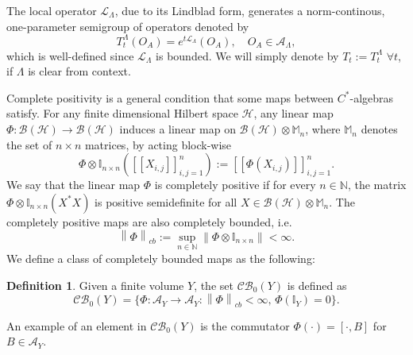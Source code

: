 \documentclass[11pt]{article}
\numberwithin{equation}{section}
\numberwithin{figure}{section}
\numberwithin{table}{section}
\theoremstyle{definition}
\newtheorem{mydef}{Definition}[section]
\theoremstyle{plain}
\theoremstyle{remark}
\newcommand{\Hil}{\mathcal{H}}
\newcommand{\Id}{\mathbb{I}}
\newcommand{\Li}{\mathcal{L}}
\newcommand{\A}{\mathcal{A}}
\newcommand{\La}{\Lambda}
\newcommand{\T}{T^\Lambda}
\newcommand{\norm}[1]{\left\lVert#1\right\rVert}
\newcommand{\normm}[2]{\left\lVert#1\right\rVert_{#2}}
\begin{document}
The local operator $\Li_\La$, due to its Lindblad form, generates a norm-continous, one-parameter semigroup of operators denoted by
\begin{equation}
    \T_t (O_A)=e^{t\Li_\La}(O_A),\quad O_A\in\A_\La,
\end{equation}
which is well-defined since $\Li_\La$ is bounded. We will simply denote by $T_t:=\T_t$ $\forall t$, if $\La$ is clear from context.

Complete positivity is a general condition that some maps between $C^*$-algebras satisfy. For any finite dimensional Hilbert space $\Hil$, any linear map $\Phi :\mathcal{B}(\Hil)\to\mathcal{B}(\Hil)$ induces a linear map on $\mathcal{B}(\Hil)\otimes \mathbb{M}_n$, where $\mathbb{M}_n$ denotes the set of $n\times n$ matrices, by acting block-wise
\begin{equation}
    \Phi\otimes \Id_{n\times n}([[X_{i,j}]]_{i,j=1}^n):= [[\Phi(X_{i,j})]]_{i,j=1}^n.
\end{equation}
We say that the linear map $\Phi$ is completely positive if for every $n\in\mathbb{N}$, the matrix $\Phi\otimes\Id_{n\times n}(X^*X)$ is positive semidefinite for all $X\in\mathcal{B}(\Hil)\otimes \mathbb{M}_n$. The completely positive maps are also completely bounded, i.e.
\begin{equation}
    \normm{\Phi}{cb}:=\sup_{n\in\mathbb{N}}\norm{\Phi\otimes \Id_{n\times n}}<\infty.
\end{equation}
We define a class of completely bounded maps as the following:
\medskip
\begin{mydef}
    Given a finite volume $Y$, the set $\mathcal{CB}_0(Y)$ is defined as
    \begin{equation}
        \mathcal{CB}_0(Y)=\{\Phi:\A_Y\to\A_Y:\normm{\Phi}{cb}<\infty,\,\Phi(\Id_Y)=0 \}.
    \end{equation}
\end{mydef}
An example of an element in $\mathcal{CB}_0(Y)$ is the commutator $\Phi(\cdot)=[\cdot,B]$ for $B\in \A_Y$.
\end{document}
